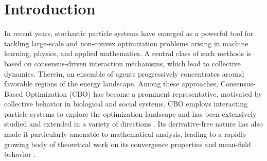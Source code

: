 \documentclass[12pt]{amsart}
\numberwithin{equation}{section}
\begin{document}
\maketitle




\section{Introduction}

In recent years, stochastic particle systems have emerged as a powerful tool for tackling large-scale and non-convex optimization problems arising in machine learning, physics, and applied mathematics. A central class of such methods is based on consensus-driven interaction mechanisms, which lead to collective dynamics. Therein, an ensemble of agents progressively concentrates around favorable regions of the energy landscape. Among these approaches, Consensus-Based Optimization (CBO) \cite{pinnau2017consensus,carrillo2018analytical} has become a prominent representative, motivated by collective behavior in biological and social systems. CBO employs interacting particle systems to explore the optimization landscape and has been extensively studied and extended in a variety of directions \cite{ha2022stochastic,borghi2022consensus,carrillo2022consensus,carrillo2021consensus,fornasier2022anisotropic,fornasier2020consensus,fornasier2024truncated,byeon2025consensus,wei2025consensus,cipriani2022zero,huang2024fast,huang2023global,roith2025consensus}. Its derivative-free nature has also made it particularly amenable to mathematical analysis, leading to a rapidly growing body of theoretical work on its convergence properties and mean-field behavior \cite{fornasier2024consensus,huang2025faithful,huang2025uniform,choi2025modified}.
\end{document}
